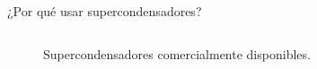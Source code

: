 \documentclass[aspectratio=169]{beamer}
\begin{document}
\begin{frame}{¿Por qué usar supercondensadores?}
\begin{columns}
\begin{column}{0.5\textwidth}
\begin{onlyenv}
\begin{figure}
						\caption{Supercondensadores comercialmente disponibles.}
					\end{figure}
				\end{onlyenv}
			\end{column}
		\end{columns}
	\end{frame}

%
%
\end{document}
